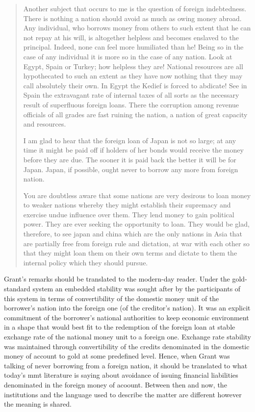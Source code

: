 \begin{quote}
Another subject that occurs to me is the question of foreign indebtedness. There is nothing a nation should avoid as much as owing money abroad. Any individual, who borrows money from others to such extent that he can not repay at his will, is altogether helpless and becomes enslaved to the principal. Indeed, none can feel more humiliated than he! Being so in the case of any individual it is more so in the case of any nation. Look at Egypt, Spain or Turkey; how helpless they are! National resources are all hypothecated to such an extent as they have now nothing that they may call absolutely their own. In Egypt the Kedief is forced to abdicate! See in Spain the extravagant rate of internal taxes of all sorts as the necessary result of superfluous foreign loans. There the corruption among revenue officials of all grades are fast ruining the nation, a nation of great capacity and resources. \par
I am glad to hear that the foreign loan of Japan is not so large; at any time it might be paid off if holders of her bonds would receive the money before they are due. The sooner it is paid back the better it will be for Japan. Japan, if possible, ought never to borrow any more from foreign nation. \par
You are doubtless aware that some nations are very desirous to loan money to weaker nations whereby they might establish their supremacy and exercise undue influence over them. They lend money to gain political power. They are ever seeking the opportunity to loan. They would be glad, therefore, to see japan and china which are the only nations in Asia that are partially free from foreign rule and dictation, at war with each other so that they might loan them on their own terms and dictate to them the internal policy which they should pursue.~\citep{grant}
\end{quote}

Grant's remarks should be translated to the modern-day reader. Under the gold-standard system an embedded stability was sought after by the participants of this system in terms of convertibility of the domestic money unit of the borrower's nation into the foreign one (of the creditor's nation). It was an explicit commitment of the borrower's national authorities to keep economic environment in a shape that would best fit to the redemption of the foreign loan at stable exchange rate of the national money unit to a foreign one. Exchange rate stability was maintained through convertibility of the credits denominated in the domestic money of account to gold at some predefined level. Hence, when Grant was talking of never borrowing from a foreign nation, it should be translated to what today's \ac{mmt} literature is saying about avoidance of issuing financial liabilities denominated in the foreign money of acoount. Between then and now, the institutions and the language used to describe the matter are different however the meaning is shared.

